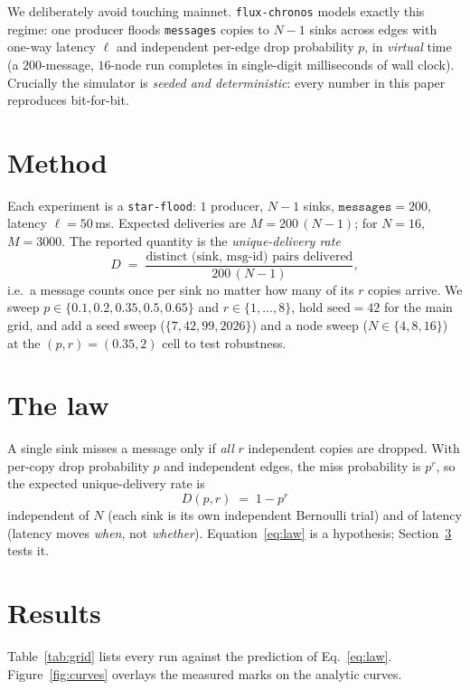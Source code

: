 \documentclass[10pt,twocolumn]{article}
\begin{document}
We deliberately avoid touching mainnet. \texttt{flux-chronos} models exactly this
regime: one producer floods \texttt{messages} copies to $N-1$ sinks across edges
with one-way latency $\ell$ and independent per-edge drop probability $p$, in
\emph{virtual} time (a $200$-message, $16$-node run completes in single-digit
milliseconds of wall clock). Crucially the simulator is \emph{seeded and
deterministic}: every number in this paper reproduces bit-for-bit.

\section{Method}
Each experiment is a \texttt{star-flood}: $1$ producer, $N-1$ sinks,
$\texttt{messages}=200$, latency $\ell=50$\,ms. Expected deliveries are
$M=200\,(N-1)$; for $N=16$, $M=3000$. The reported quantity is the
\emph{unique-delivery rate}
\[
D \;=\; \frac{\text{distinct (sink, msg-id) pairs delivered}}{200\,(N-1)},
\]
i.e.\ a message counts once per sink no matter how many of its $r$ copies arrive.
We sweep $p\in\{0.1,0.2,0.35,0.5,0.65\}$ and $r\in\{1,\dots,8\}$, hold
$\text{seed}=42$ for the main grid, and add a seed sweep
($\{7,42,99,2026\}$) and a node sweep ($N\in\{4,8,16\}$) at the
$(p,r)=(0.35,2)$ cell to test robustness.

\section{The law}
A single sink misses a message only if \emph{all} $r$ independent copies are
dropped. With per-copy drop probability $p$ and independent edges, the miss
probability is $p^{r}$, so the expected unique-delivery rate is
\begin{equation}
\boxed{\,D(p,r) \;=\; 1 - p^{r}\,}
\label{eq:law}
\end{equation}
independent of $N$ (each sink is its own independent Bernoulli trial) and of
latency (latency moves \emph{when}, not \emph{whether}). Equation~\eqref{eq:law}
is a hypothesis; Section~\ref{sec:results} tests it.

\section{Results}\label{sec:results}
Table~\ref{tab:grid} lists every run against the prediction of
Eq.~\eqref{eq:law}. Figure~\ref{fig:curves} overlays the measured marks on the
analytic curves.
\end{document}
